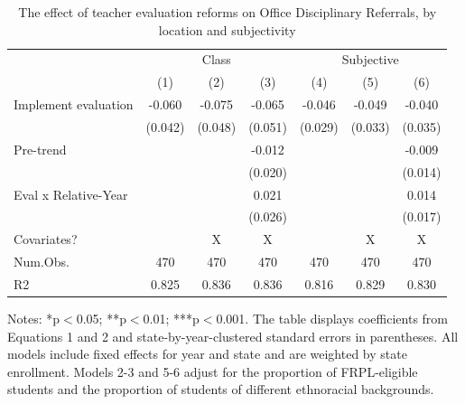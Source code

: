 \begin{table}
\centering
\caption{The effect of teacher evaluation reforms on Office Disciplinary Referrals, by location and subjectivity \label{tab:mainDD}}
\centering
\begin{threeparttable}
\begin{tabular}[t]{lcccccc}
\toprule
       & \multicolumn{3}{c}{Class} & \multicolumn{3}{c}{Subjective}\\
& (1)           & (2)           & (3)           & (4)           & (5)           & (6)\\  
\midrule 
Implement evaluation & -0.060 & -0.075 & -0.065 & -0.046 & -0.049 & -0.040\\
 & (0.042) & (0.048) & (0.051) & (0.029) & (0.033) & (0.035)\\
Pre-trend &  &  & -0.012 &  &  & -0.009\\
 &  &  & (0.020) &  &  & (0.014)\\
Eval x Relative-Year &  &  & 0.021 &  &  & 0.014\\
 &  &  & (0.026) &  &  & (0.017)\\
\midrule
Covariates? &  & X & X &  & X & X\\
Num.Obs. & 470 & 470 & 470 & 470 & 470 & 470\\
R2 & 0.825 & 0.836 & 0.836 & 0.816 & 0.829 & 0.830\\
\bottomrule
\end{tabular}
\begin{tablenotes}
\item Notes: *p$<$0.05; **p$<$0.01; ***p$<$0.001. The table displays coefficients from Equations 1 and 2 and state-by-year-clustered standard errors in parentheses. All models include fixed effects for year and state and are weighted by state enrollment. Models 2-3 and 5-6 adjust for the proportion of FRPL-eligible students and the proportion of students of different ethnoracial backgrounds.
\end{tablenotes}
\end{threeparttable}
\end{table}
